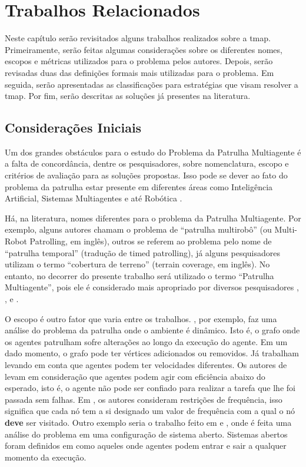 \chapter{Trabalhos Relacionados}
\label{chp:background}

Neste capítulo serão revisitados alguns trabalhos realizados sobre a \ac{tmap}. 
Primeiramente, serão feitas algumas considerações sobre os diferentes nomes,  
escopos e métricas utilizados para o problema pelos autores. Depois, serão 
revisadas duas das definições formais mais utilizadas para o problema. Em 
seguida, serão apresentadas as classificações para estratégias que visam 
resolver a \ac{tmap}. Por fim, serão descritas as soluções já presentes na 
literatura.

\section{Considerações Iniciais}
\label{sec:consideracoesIniciais}

Um dos grandes obstáculos para o estudo do Problema da Patrulha Multiagente é a 
falta de concordância, dentre os pesquisadores, sobre nomenclatura, escopo e 
critérios de avaliação para as soluções propostas. Isso pode se dever ao fato do 
problema da patrulha estar presente em diferentes áreas como Inteligência 
Artificial, Sistemas Multiagentes e até Robótica \citep{sampaiophd}.

Há, na literatura, nomes diferentes para o problema da Patrulha Multiagente. Por 
exemplo, alguns autores \citep{hernandez2013game} chamam o problema de “patrulha 
multirobô” (ou Multi-Robot Patrolling, em inglês), outros \citep{6495145} se 
referem ao problema pelo nome de “patrulha temporal” (tradução de timed 
patrolling), já alguns pesquisadores \citep{Koenig:2001:TCA:375735.376463} 
utilizam o termo “cobertura de terreno” (terrain coverage, em inglês). No 
entanto, no decorrer do presente trabalho será utilizado o termo “Patrulha 
Multiagente”, pois ele é considerado mais apropriado por diversos pesquisadores 
\citep{6900280}, \citep{sampaiophd}, e \citep{6315145}.

O escopo é outro fator que varia entre os trabalhos. \citep{6615158}, por 
exemplo, faz uma análise do problema da patrulha onde o ambiente é dinâmico. 
Isto é, o grafo onde os agentes patrulham sofre alterações ao longo da execução 
do agente. Em um dado momento, o grafo pode ter vértices adicionados ou 
removidos. Já \citep{6900280} trabalham levando em conta que agentes podem ter 
velocidades diferentes. Os autores de \citep{Pippin:2013:PBT:2480362.2480378} 
levam em consideração que agentes podem agir com eficiência abaixo do esperado, 
isto é, o agente não pode ser confiado para realizar a tarefa que lhe foi 
passada sem falhas. Em \citep{4209122}, os autores consideram restrições de 
frequência, isso significa que cada nó tem a si designado um valor de frequência 
com a qual o nó \textbf{deve} ser visitado. Outro exemplo seria o trabalho feito 
em \citep{6495145} e \citep{Poulet:2012:b}, onde é feita uma análise do problema 
em uma configuração de sistema aberto. Sistemas abertos foram definidos em 
\citep{6040660} como aqueles onde agentes podem entrar e sair a qualquer momento 
da execução.

